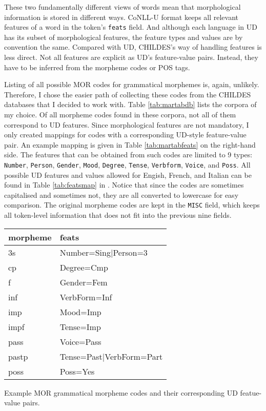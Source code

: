 These two fundamentally different views of words mean that morphological information is stored in different ways. CoNLL-U format keeps all relevant features of a word in the token's \texttt{feats} field. And although each language in UD has its subset of morphological features, the feature types and values are by convention the same. Compared with UD, CHILDES's way of handling features is less direct. Not all features are explicit as UD's feature-value pairs. Instead, they have to be inferred from the morpheme codes or POS tags.

Listing of all possible MOR codes for grammatical morphemes is, again, unlikely. Therefore, I chose the easier path of collecting these codes from the CHILDES databases that I decided to work with. Table \ref{tab:martabdb} lists the corpora of my choice. Of all morpheme codes found in these corpora, not all of them correspond to UD features. Since morphological features are not mandatory, I only created mappings for codes with a corresponding UD-style feature-value pair. An example mapping is given in Table \ref{tab:martabfeats} on the right-hand side. The features that can be obtained from such codes are limited to 9 types: \texttt{Number}, \texttt{Person}, \texttt{Gender}, \texttt{Mood}, \texttt{Degree}, \texttt{Tense}, \texttt{Verbform}, \texttt{Voice}, and \texttt{Poss}. All possible UD features and values allowed for Engish, French, and Italian can be found in Table \ref{tab:featsmap} in . Notice that since the codes are sometimes capitalised and sometimes not, they are all converted to lowercase for easy comparison. The original morpheme codes are kept in the \texttt{MISC} field, which keeps all token-level information that does not fit into the previous nine fields.

\begin{margintable}[1\baselineskip]
\begin{tabularx}{1\textwidth}{@{}ll@{}}
\toprule
\textbf{morpheme} & \textbf{feats}\\ \midrule
	3s & Number=Sing|Person=3\\
	cp & Degree=Cmp\\
	f & Gender=Fem\\
	inf & VerbForm=Inf\\
	imp & Mood=Imp\\
	impf & Tense=Imp\\
	pass & Voice=Pass\\
	pastp & Tense=Past|VerbForm=Part\\
	poss & Poss=Yes\\\bottomrule
\end{tabularx}
\caption{\label{tab:martabfeats}Example MOR grammatical morpheme codes and their corresponding UD featue-value pairs.}
\footnotesize
\end{margintable}


